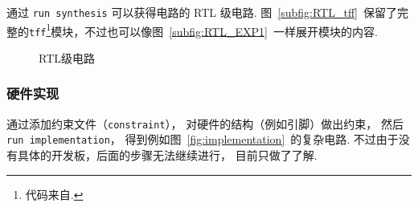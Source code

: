 \documentclass[11pt]{SEU-Digital-Report}
\begin{document}
                通过 \texttt{run synthesis} 可以获得电路的 RTL 级电路.
                图~\ref{subfig:RTL_tff}~保留了完整的\texttt{tff}\footnote{代码来自\cite{github:fpga-verilog}.}模块，不过也可以像图~\ref{subfig:RTL_EXP1}~一样展开模块的内容.

                \begin{figure}[htbp]
                    \centering
                    \hfill
                    \caption{RTL级电路}
                    \label{fig:RTL}
                \end{figure}

            \subsubsection{硬件实现}

                通过添加约束文件（\texttt{constraint}），
                对硬件的结构（例如引脚）做出约束，
                然后 \texttt{run implementation}，
                得到例如图~\ref{fig:implementation}~的复杂电路.
                不过由于没有具体的开发板，后面的步骤无法继续进行，
                目前只做了了解.
\end{document}
